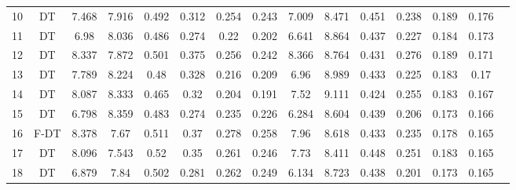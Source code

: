 \begin{longtable}{@{\hskip3pt}c@{\hskip3pt}c@{\hskip3pt}c@{\hskip3pt}c@{\hskip3pt}c@{\hskip3pt}c@{\hskip3pt}c@{\hskip3pt}c@{\hskip3pt}c@{\hskip3pt}c@{\hskip3pt}c@{\hskip3pt}c@{\hskip3pt}c@{\hskip3pt}c@{\hskip3pt}c}
         10 &             DT &             7.468 &          7.916 &           0.492 &           0.312 &           0.254 &           0.243 &               7.009 &           8.471 &           0.451 &         0.238 &          0.189 &           0.176 \\
         11 &             DT &              6.98 &          8.036 &           0.486 &           0.274 &            0.22 &           0.202 &               6.641 &           8.864 &           0.437 &         0.227 &          0.184 &           0.173 \\
         12 &             DT &             8.337 &          7.872 &           0.501 &           0.375 &           0.256 &           0.242 &               8.366 &           8.764 &           0.431 &         0.276 &          0.189 &           0.171 \\
         13 &             DT &             7.789 &          8.224 &            0.48 &           0.328 &           0.216 &           0.209 &                6.96 &           8.989 &           0.433 &         0.225 &          0.183 &            0.17 \\
         14 &             DT &             8.087 &          8.333 &           0.465 &            0.32 &           0.204 &           0.191 &                7.52 &           9.111 &           0.424 &         0.255 &          0.183 &           0.167 \\
         15 &             DT &             6.798 &          8.359 &           0.483 &           0.274 &           0.235 &           0.226 &               6.284 &           8.604 &           0.439 &         0.206 &          0.173 &           0.166 \\
         16 &           F-DT &             8.378 &           7.67 &           0.511 &            0.37 &           0.278 &           0.258 &                7.96 &           8.618 &           0.433 &         0.235 &          0.178 &           0.165 \\
         17 &             DT &             8.096 &          7.543 &            0.52 &            0.35 &           0.261 &           0.246 &                7.73 &           8.411 &           0.448 &         0.251 &          0.183 &           0.165 \\
         18 &             DT &             6.879 &           7.84 &           0.502 &           0.281 &           0.262 &           0.249 &               6.134 &           8.723 &           0.438 &         0.201 &          0.173 &           0.165 \\

\end{longtable}
